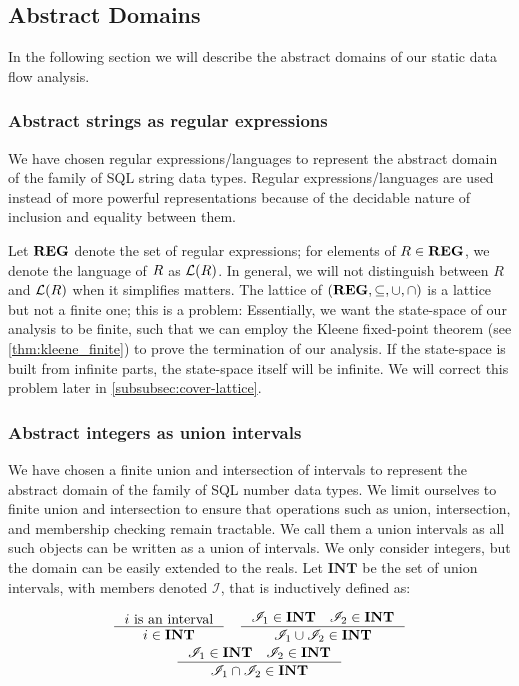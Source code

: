\subsection{Abstract Domains}\label{subsec:abstract-domains}

In the following section we will describe the abstract domains of our static data flow analysis.

\subsubsection{Abstract strings as regular expressions}\label{subsubsec:abstract_domains_strings}
We have chosen regular expressions/languages to represent the abstract domain of the family of SQL string data types.
Regular expressions/languages are used instead of more powerful representations because of the decidable nature of inclusion and equality between them.

Let $\mathbf{REG}$ denote the set of regular expressions; for elements of $R \in \mathbf{REG}$, we denote the language of $R$ as $\mathcal{L}(R)$.
In general, we will not distinguish between $R$ and $\mathcal{L}(R)$ when it simplifies matters.
The lattice of $(\mathbf{REG}, \subseteq, \cup, \cap)$ is a lattice but not a finite one; this is a problem: Essentially, we want the state-space of our analysis to be finite, such that we can employ the Kleene fixed-point theorem (see \autoref{thm:kleene_finite}) to prove the termination of our analysis.
If the state-space is built from infinite parts, the state-space itself will be infinite.
We will correct this problem later in \autoref{subsubsec:cover-lattice}.

\subsubsection{Abstract integers as union intervals}\label{subsubsec:abstract_domains_numbers}
We have chosen a finite union and intersection of intervals to represent the abstract domain of the family of SQL number data types.
We limit ourselves to finite union and intersection to ensure that operations such as union, intersection, and membership checking remain tractable.
We call them a union intervals as all such objects can be written as a union of intervals.
We only consider integers, but the domain can be easily extended to the reals.
Let $\mathbf{INT}$ be the set of union intervals, with members denoted $\mathscr{I}$, that is inductively defined as:


\begin{gather*}
    \inference{i \text{ is an interval}}{i \in \mathbf{INT}} \quad
    \inference{\mathscr{I}_1 \in \textbf{INT} \quad \mathscr{I}_2 \in \textbf{INT}}{\mathscr{I}_1 \cup  \mathscr{I}_2 \in \mathbf{INT}}\\
    \inference{\mathscr{I}_1 \in \textbf{INT} \quad \mathscr{I}_2 \in \textbf{INT}}{\mathscr{I}_1 \cap  \mathscr{I}_2 \in \mathbf{INT}}
\end{gather*}


